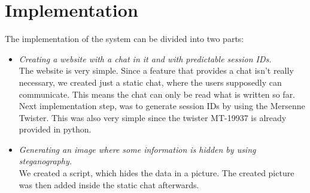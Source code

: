 \documentclass[11pt]{article}
\begin{document}
\section{Implementation}

The implementation of the system can be divided into two parts:
\begin{itemize}
	\item \textit{Creating a website with a chat in it and with predictable session IDs.} \\
	 The website is very simple. Since a feature that provides a chat isn't really necessary, we created just a static chat, where the users supposedly can communicate. This means the chat can only be read what is written so far.
Next implementation step, was to generate session IDs by using the Mersenne Twister. This was also very simple since the twister MT-19937 is already provided in python.
	\item \textit{Generating an image where some information is hidden by using steganography.}\\
	We created a script, which hides the data in a picture. The created picture was then added inside the static chat afterwards.
\end{itemize}

\begin{spacing}{1}
  
  
\end{spacing}
\end{document}
